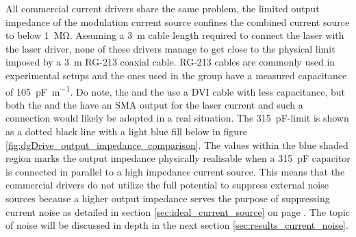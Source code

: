 All commercial current drivers share the same problem, the limited output impedance of the modulation current source confines the combined current source to below \qty{1}{\mega\ohm}. Assuming a \qty{3}{\m} cable length required to connect the laser with the laser driver, none of these drivers manage to get close to the physical limit imposed by a \qty{3}{\m} RG-213 coaxial cable. RG-213 cables are commonly used in experimental setups and the ones used in the group have a measured capacitance of \qty{105}{\pF \per \m}. Do note, the  and the  use a DVI cable with less capacitance, but both the  and the  have an SMA output for the laser current and such a connection would likely be adopted in a real situation. The \qty{315}{\pF}-limit is shown as a dotted black line with a light blue fill below in figure \ref{fig:dgDrive_output_impedance_comparison}. The values within the blue shaded region marks the output impedance physically realisable when a \qty{315}{\pF} capacitor is connected in parallel to a high impedance current source. This means that the commercial drivers do not utilize the full potential to suppress external noise sources because a higher output impedance serves the purpose of suppressing current noise as detailed in section \ref{sec:ideal_current_source} on page \pageref{sec:ideal_current_source}. The topic of noise will be discussed in depth in the next section \ref{sec:results_current_noise}.


